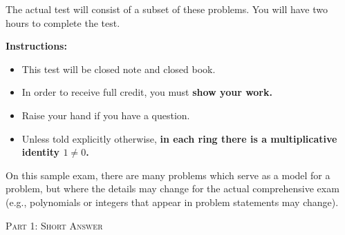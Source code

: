 \documentclass[12pt]{amsart}
\newcommand{\bc}{\begin{center}}
\newcommand{\ec}{\end{center}}
\begin{document}
\thispagestyle{fancy}


The actual test will consist of a subset of these problems. You will have two hours to complete the test.

{\bf Instructions:}

\begin{itemize}

\item 
This test will be closed note and closed book.
\item
In order to receive full credit, you must {\bf show your work.}  
\item
Raise your hand if you have a question.
\item Unless told explicitly otherwise, {\bf in each ring there is a multiplicative identity $1\ne 0$.}
\end{itemize}
On this sample exam, there are many problems which serve as a model for a problem, but where the details may change for the actual comprehensive exam (e.g., polynomials or integers that appear in problem statements may change).
%
\bc \Large\textsc{Part 1: Short Answer} \ec
\end{document}
